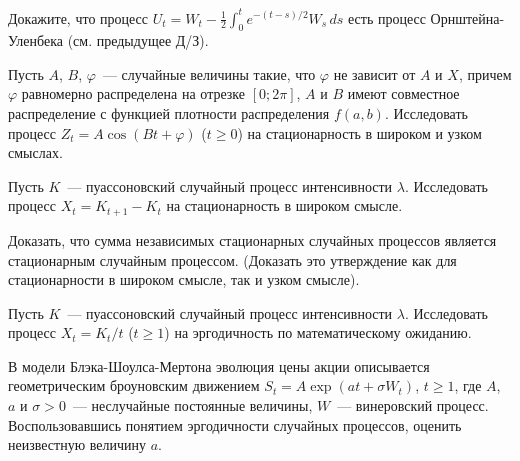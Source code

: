 \documentclass[12pt]{article}
\def\canon{\textbf{(каноническое задание)}}
\begin{document}
\begin{exercise}
    Докажите, что процесс $ \displaystyle U_t = W_t - \frac{1}{2} \int_0^t e^{-(t - s)/2} W_s \, ds $
    есть процесс Орнштейна-Уленбека (см. предыдущее Д/З).
\end{exercise}

\newpage




\begin{exercise}[subtitle={\canon}]
    Пусть $ A $, $ B $, $ \varphi $~--- случайные величины такие,
    что $ \varphi $ не зависит от $ A $ и $ X $,
    причем $ \varphi $ равномерно распределена на отрезке $ [0; 2\pi] $,
    $ A $ и $ B $ имеют совместное распределение с функцией плотности распределения $ f(a, b) $.
    Исследовать процесс $ Z_t = A \cos(B t + \varphi) $ ($ t \geqslant 0 $) на стационарность в широком и узком смыслах.
\end{exercise}


\begin{exercise}[subtitle={\canon}]
    Пусть $ K $~--- пуассоновский случайный процесс интенсивности $ \lambda $.
    Исследовать процесс $ X_t = K_{t+1} - K_t $ на стационарность в широком смысле.
\end{exercise}


\begin{exercise}[subtitle={\canon}]
    Доказать, что сумма независимых стационарных случайных процессов является стационарным случайным процессом.
    (Доказать это утверждение как для стационарности в широком смысле, так и узком смысле).
\end{exercise}


\begin{exercise}[subtitle={\canon}]
    Пусть $ K $~--- пуассоновский случайный процесс интенсивности $ \lambda $.
    Исследовать процесс $ X_t = K_t / t $ ($ t \geqslant 1 $) на эргодичность по математическому ожиданию.
\end{exercise}


\begin{exercise}[subtitle={\canon}]
    В модели Блэка-Шоулса-Мертона эволюция цены акции описывается геометрическим броуновским движением
    $ S_t = A \exp(a t + \sigma W_t) $, $ t \geqslant 1 $,
    где $ A $, $ a $ и $ \sigma > 0 $~--- неслучайные постоянные величины,
    $ W $~--- винеровский процесс.
    Воспользовавшись понятием эргодичности случайных процессов, оценить неизвестную величину $ a $.
\end{exercise}
\end{document}
